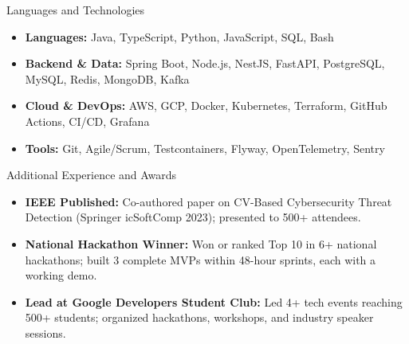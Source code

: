 \documentclass[]{mcdowellcv}
\begin{document}
\begin{cvsection}{Languages and Technologies}
  \begin{cvsubsection}{}{}{}
    \begin{itemize}
      \item \textbf{Languages:} Java, TypeScript, Python, JavaScript, SQL, Bash
      \item \textbf{Backend \& Data:} Spring Boot, Node.js, NestJS, FastAPI, PostgreSQL, MySQL, Redis, MongoDB, Kafka
      \item \textbf{Cloud \& DevOps:} AWS, GCP, Docker, Kubernetes, Terraform, GitHub Actions, CI/CD, Grafana
      \item \textbf{Tools:} Git, Agile/Scrum, Testcontainers, Flyway, OpenTelemetry, Sentry
    \end{itemize}
  \end{cvsubsection}
\end{cvsection}

\begin{cvsection}{Additional Experience and Awards}
  \begin{cvsubsection}{}{}{}
    \begin{itemize}
      \item \textbf{IEEE Published:} Co-authored paper on CV-Based Cybersecurity Threat Detection (Springer icSoftComp 2023); presented to 500+ attendees.
      \item \textbf{National Hackathon Winner:} Won or ranked Top 10 in 6+ national hackathons; built 3 complete MVPs within 48-hour sprints, each with a working demo.
      \item \textbf{Lead at Google Developers Student Club:} Led 4+ tech events reaching 500+ students; organized hackathons, workshops, and industry speaker sessions.
    \end{itemize}
  \end{cvsubsection}
\end{cvsection}
\end{document}
